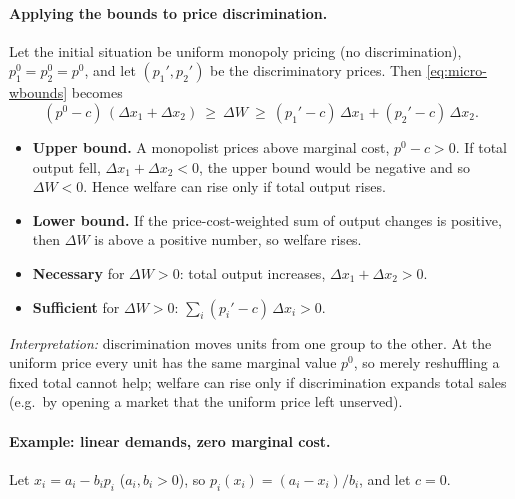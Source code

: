 \paragraph{Applying the bounds to price discrimination.} Let the initial situation be uniform monopoly pricing (no discrimination), $p_1^0=p_2^0=p^0$, and let $(p_1',p_2')$ be the discriminatory prices. Then \eqref{eq:micro-wbounds} becomes
\[
(p^0-c)\,(\Delta x_1+\Delta x_2)\ \ge\ \Delta W\ \ge\ (p_1'-c)\,\Delta x_1+(p_2'-c)\,\Delta x_2 .
\]
\begin{itemize}
\item \textbf{Upper bound.} A monopolist prices above marginal cost, $p^0-c>0$. If total output fell, $\Delta x_1+\Delta x_2<0$, the upper bound would be negative and so $\Delta W<0$. Hence welfare can rise only if total output rises.
\item \textbf{Lower bound.} If the price-cost-weighted sum of output changes is positive, then $\Delta W$ is above a positive number, so welfare rises.
\end{itemize}
\begin{keybox}[title=Welfare effect of third-degree price discrimination]
\begin{itemize}
\item \textbf{Necessary} for $\Delta W>0$: total output increases, $\Delta x_1+\Delta x_2>0$.
\item \textbf{Sufficient} for $\Delta W>0$: $\sum_i(p_i'-c)\,\Delta x_i>0$.
\end{itemize}
\end{keybox}
\emph{Interpretation:} discrimination moves units from one group to the other. At the uniform price every unit has the same marginal value $p^0$, so merely reshuffling a fixed total cannot help; welfare can rise only if discrimination expands total sales (e.g.\ by opening a market that the uniform price left unserved).

\paragraph{Example: linear demands, zero marginal cost.} Let $x_i=a_i-b_ip_i$ ($a_i,b_i>0$), so $p_i(x_i)=(a_i-x_i)/b_i$, and let $c=0$.

